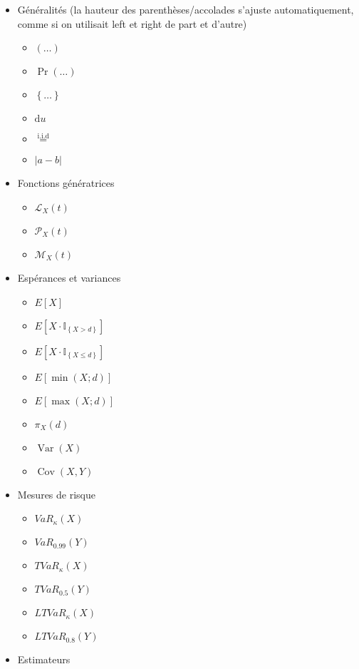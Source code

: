 \documentclass{article}
\renewcommand{\d}[1]{\mathrm{d}#1}
\newcommand{\auto}[1]{\left(#1\right)}
\newcommand{\set}[1]{\left\{#1\right\}}
\newcommand{\abs}[1]{\left|#1\right|}
\newcommand{\tls}[2]{\mathcal{L}_{#1}\left(#2\right)}
\newcommand{\fgm}[2]{\mathcal{M}_{#1}\left(#2\right)}
\newcommand{\fgp}[2]{\mathcal{P}_{#1}\left(#2\right)}
\newcommand{\prob}[1]{\Pr\left(#1\right)}
\newcommand{\iid}[1]{\stackrel{\mathrm{i.i.d}}{#1}}
\newcommand{\VaR}[1]{VaR_\kappa\left(#1\right)}
\newcommand{\VaRd}[2]{VaR_{#1}\left(#2\right)}
\newcommand{\TVaR}[1]{TVaR_\kappa\left(#1\right)}
\newcommand{\TVaRd}[2]{TVaR_{#1}\left(#2\right)}
\newcommand{\LTVaR}[1]{LTVaR_\kappa\left(#1\right)}
\newcommand{\LTVaRd}[2]{LTVaR_{#1}\left(#2\right)}
\newcommand{\stoploss}[2]{\pi_{#1}\left(#2\right)}
\newcommand{\esp}[1]{E\left[ #1 \right]}
\newcommand{\espmin}[2]{E\left[\min\left(#1;#2\right)\right]}
\newcommand{\espmax}[2]{E\left[\max\left(#1;#2\right)\right]}
\newcommand{\esptrD}[2]{E\left[#1\cdot\mathbb{I}_{\left\{#1>#2\right\}}\right]}
\newcommand{\esptrU}[2]{E\left[#1\cdot\mathbb{I}_{\left\{#1\leq#2\right\}}\right]}
\newcommand{\cov}[2]{\operatorname{Cov}\left(#1, #2\right)}
\newcommand{\var}[1]{\operatorname{Var}\left( #1 \right)}
\begin{document}
\begin{itemize}
    \item Généralités (la hauteur des parenthèses/accolades s'ajuste automatiquement, comme si on utilisait left et right de part et d'autre)
    \begin{itemize}
        \item $\auto{ \dots }$
        \item $\prob{ \dots }$
        \item $\set{ \dots }$
        \item $\d{u}$
        \item $\iid{=}$
        \item $\abs{a - b}$
    \end{itemize}
    \item Fonctions génératrices
    \begin{itemize}
        \item $\tls{X}{t}$
        \item $\fgp{X}{t}$
        \item $\fgm{X}{t}$
    \end{itemize}
    \item Espérances et variances
    \begin{itemize}
        \item $\esp{X}$
        \item $\esptrD{X}{d}$
        \item $\esptrU{X}{d}$
        \item $\espmin{X}{d}$
        \item $\espmax{X}{d}$
        \item $\stoploss{X}{d}$
        \item $\var{X}$
        \item $\cov{X}{Y}$
    \end{itemize}
    \item Mesures de risque
    \begin{itemize}
        \item $\VaR{X}$
        \item $\VaRd{0.99}{Y}$
        \item $\TVaR{X}$
        \item $\TVaRd{0.5}{Y}$
        \item $\LTVaR{X}$
        \item $\LTVaRd{0.8}{Y}$
    \end{itemize}
    \item Estimateurs
    \begin{itemize}

\end{itemize}
\end{itemize}
\end{document}
